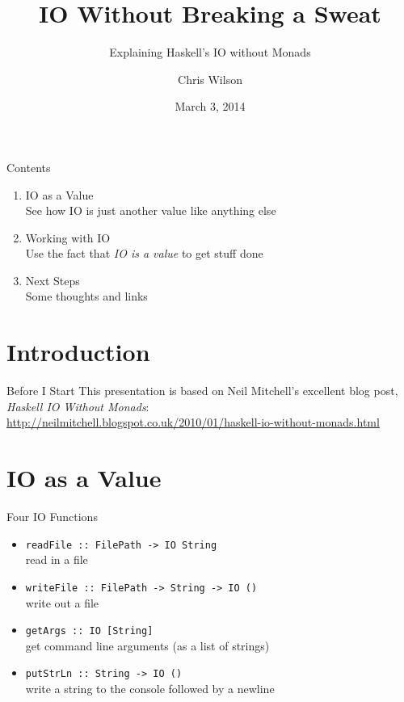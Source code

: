 \documentclass{beamer}
\title{IO Without Breaking a Sweat}
\subtitle{Explaining Haskell's IO without Monads}
\author{Chris Wilson}
\date{March 3, 2014}
\begin{document}
\setcounter{showProgressBar}{0}
\setcounter{showSlideNumbers}{0}

\frame{\titlepage}

\begin{frame}{Contents}
\begin{enumerate}
\item IO as a Value \\ \textcolor{ExecusharesGrey}{\footnotesize\hspace{1em} See how IO is just another value like anything else}
\item Working with IO  \\ \textcolor{ExecusharesGrey}{\footnotesize\hspace{1em} Use the fact that \emph{IO is a value} to get stuff done}
\item Next Steps \\ \textcolor{ExecusharesGrey}{\footnotesize\hspace{1em} Some thoughts and links}
\end{enumerate}
\end{frame}

\setcounter{framenumber}{0}
\setcounter{showProgressBar}{1}
\setcounter{showSlideNumbers}{1}


\section{Introduction}

\begin{frame}{Before I Start}
This presentation is based on Neil Mitchell's excellent blog post,
\emph{Haskell IO Without Monads}: \\
\small{\url{http://neilmitchell.blogspot.co.uk/2010/01/haskell-io-without-monads.html}}
\end{frame}


\section{IO as a Value}

\begin{frame}{Four IO Functions}
\begin{itemize}
\item \lstinline{readFile :: FilePath -> IO String} \\ read in a file
\item \lstinline{writeFile :: FilePath -> String -> IO ()} \\ write out a file
\item \lstinline{getArgs :: IO [String]} \\ get command line arguments (as a list of strings)
\item \lstinline{putStrLn :: String -> IO ()} \\ write a string to the
console followed by a newline
\end{itemize}
\end{frame}
\end{document}
